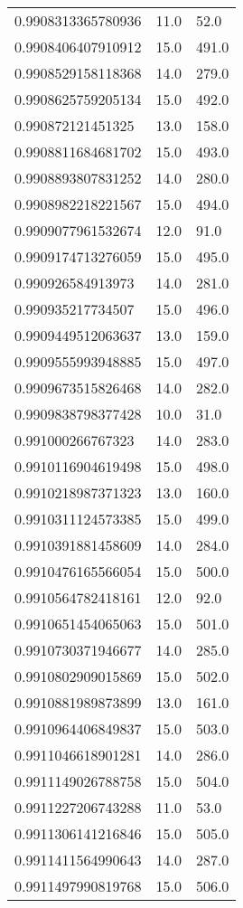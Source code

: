 \begin{center}
\begin{supertabular}[H]{p{0.30\textwidth}p{0.05\textwidth}p{0.05\textwidth}}
0.9908313365780936 & 11.0 & 52.0 \\ 
0.9908406407910912 & 15.0 & 491.0 \\ 
0.9908529158118368 & 14.0 & 279.0 \\ 
0.9908625759205134 & 15.0 & 492.0 \\ 
0.990872121451325 & 13.0 & 158.0 \\ 
0.9908811684681702 & 15.0 & 493.0 \\ 
0.9908893807831252 & 14.0 & 280.0 \\ 
0.9908982218221567 & 15.0 & 494.0 \\ 
0.9909077961532674 & 12.0 & 91.0 \\ 
0.9909174713276059 & 15.0 & 495.0 \\ 
0.990926584913973 & 14.0 & 281.0 \\ 
0.990935217734507 & 15.0 & 496.0 \\ 
0.9909449512063637 & 13.0 & 159.0 \\ 
0.9909555993948885 & 15.0 & 497.0 \\ 
0.9909673515826468 & 14.0 & 282.0 \\ 
0.9909838798377428 & 10.0 & 31.0 \\ 
0.991000266767323 & 14.0 & 283.0 \\ 
0.9910116904619498 & 15.0 & 498.0 \\ 
0.9910218987371323 & 13.0 & 160.0 \\ 
0.9910311124573385 & 15.0 & 499.0 \\ 
0.9910391881458609 & 14.0 & 284.0 \\ 
0.9910476165566054 & 15.0 & 500.0 \\ 
0.9910564782418161 & 12.0 & 92.0 \\ 
0.9910651454065063 & 15.0 & 501.0 \\ 
0.9910730371946677 & 14.0 & 285.0 \\ 
0.9910802909015869 & 15.0 & 502.0 \\ 
0.9910881989873899 & 13.0 & 161.0 \\ 
0.9910964406849837 & 15.0 & 503.0 \\ 
0.9911046618901281 & 14.0 & 286.0 \\ 
0.9911149026788758 & 15.0 & 504.0 \\ 
0.9911227206743288 & 11.0 & 53.0 \\ 
0.9911306141216846 & 15.0 & 505.0 \\ 
0.9911411564990643 & 14.0 & 287.0 \\ 
0.9911497990819768 & 15.0 & 506.0 \\ 

\end{supertabular}
\end{center}
